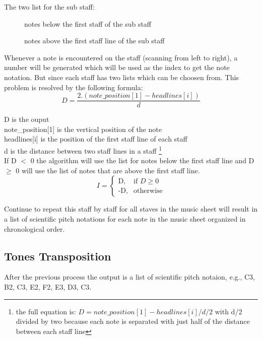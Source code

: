 \documentclass[final]{cvpr}
\begin{document}
\vspace{\baselineskip}
The two list for the sub staff:
\begin{figure}[h]
['G3','F3','E3','D3','C3','B2','A2','G2','F2','E2','D2,
'C2', 'B1','A1','G1','F1','E1']
\caption{notes below the first staff of the sub staff}
\vspace{\baselineskip}
\makebox[\columnwidth]{['G3','A3','B3','C4','D4','E4','F4','G4','A4','B4']}
\caption{notes above the first staff line of the sub staff}
\end{figure}

Whenever a note is encountered on the staff (scanning from left to right), a
number will be generated which will be used as the index to get the note
notation. But since each staff has two lists which can be choosen from. This
problem is resolved by the following formula:\\

\[D = \frac{2.(note\_position[1] - headlines[i])}{d}\]

\noindent D is the ouput\\
note\_position[1] is the vertical position of the note\\
headlines[i] is the position of the first staff line of each staff\\
d is the distance between two staff lines in a staff \footnote{the 
full equation is: \(D = note\_position[1] -headlines[i] / d/2\)
with d/2 divided by two because each note is separated with just half of the distance between
each staff line}\\

If D $<$ 0 the algorithm will use the list for notes below the first staff line
and D $\geq$ 0 will use the list of notes that are above the first staff line.\\

\[ I = \begin{cases} \mbox{D,} & \mbox{if } D \geq 0 \\ \mbox{-D,} &
\mbox{otherwise} \end{cases}\]

Continue to repeat this staff by staff for all staves in the music sheet will
result in a list of scientific pitch notations for each note in the music sheet
organized in chronological order.\\

\subsection{Tones Transposition}
After the previous process the output is a list of scientific pitch notaion,
e.g., C3, B2, C3, E2, F2, E3, D3, C3.\\
\end{document}
